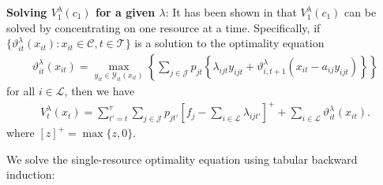 \documentclass[11pt]{article}
\begin{document}
\vspace{0.5cm}

\noindent
\textbf{Solving $V^{\lambda}_{1}(c_{1})$ for a given $\lambda$}: 
It has been shown in \cite{topaloglu2009using} that $V^{\lambda}_{1}(c_{1})$ can be solved by concentrating on one resource at a time. 
Specifically, if \(\{\vartheta^\lambda_{it}(x_{it}): x_{it} \in \mathcal{C}, t \in \mathcal{T}\}\) is a solution to the optimality equation
\begin{align*}
\vartheta^\lambda_{it}(x_{it}) = \max_{y_{it}\in\mathcal{Y}_{it}(x_{it})}\left\{\sum_{j\in\mathcal{J}} p_{jt}\left\{\lambda_{ijt} y_{ijt} + \vartheta^\lambda_{i,t+1}(x_{it} - a_{ij} y_{ijt})\right\}\right\}
\end{align*}
for all \(i \in \mathcal{L}\), then we have
\begin{align*}
V^\lambda_t(x_t) = \sum_{t' = t}^\tau \sum_{j \in \mathcal{J}} p_{jt'}\left[f_j - \sum_{i \in \mathcal{L}} \lambda_{ijt'}\right]^+ + \sum_{i \in \mathcal{L}} \vartheta^\lambda_{it}(x_{it}).
\end{align*}
where $[z]^+ = \max\{z, 0\}$.

\vspace{0.5cm}

\noindent
We solve the single-resource optimality equation using tabular backward induction:
\end{document}
